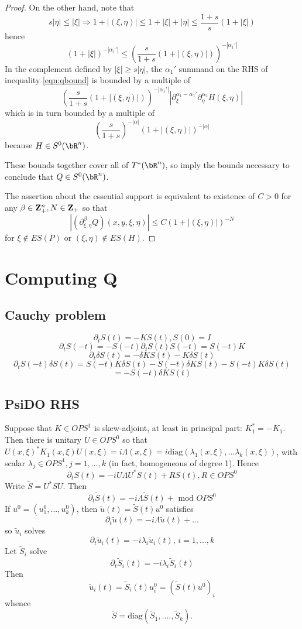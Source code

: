 \begin{proof}
  On the other hand, note that
  \[
    s|\eta| \le |\xi| \Rightarrow 1 + |(\xi,\eta)| \le 1 + |\xi| + |\eta| 
    \le \frac{1+s}{s} (1+ |\xi|) 
  \]
  hence
  \[
    (1 + |\xi|)^{-|\alpha_1'|} \le \left(\frac{s}{1+s}(1+|(\xi,\eta)|)\right)^{-|\alpha_1'|}   
  \]
  In the complement defined by $|\xi|\ge s|\eta|$, the $\alpha_1'$  summand on the RHS of inequality \ref{eqn:qbound} is bounded by a multiple of
  \[
    \left(\frac{s}{1+s}(1 + |(\xi,\eta)|)\right)^{-|\alpha_1'|}|\partial_{\xi}^{\alpha_1-\alpha_1'}\partial_{\eta}^{\alpha_2}H(\xi,\eta) |
  \]
  which is in turn bounded by a multiple of
  \[
    \left(\frac{s}{1+s}\right)^{-|\alpha|} (1+|(\xi,\eta)|)^{-|\alpha|}
  \]
  because $H \in S^0(\bR^n)$.

  These bounds together cover all of $T^*(\bR^n)$, so imply the bounds necessary to conclude that $Q \in S^0(\bR^n)$.
    
  The assertion about the essential support is equivalent to existence of $C>0$ for any $\beta \in {\bf Z}_+^n, N \in {\bf Z}_+$ so that
  \[
    |(\partial_{\xi,\eta}^{\beta} Q)(x,y,\xi, \eta)| \le C(1+|(\xi,\eta)|)^{-N}
  \]
  for $\xi \notin ES(P)$ or $(\xi,\eta) \notin ES(H)$.
\end{proof}

\section{Computing Q}

\subsection{Cauchy problem}
\[
  \partial_t S(t) = -K S(t), S(0)=I
\]
\[
  \partial_t S(-t) = -S(-t) \partial_t S(t) S(-t) = S(-t)K
\]
\[
  \partial_t \delta S(t) = - \delta K S(t) - K \delta S(t)
\]
\[
  \partial_t S(-t)\delta S(t) = S(-t)K\delta S(t) - S(-t) \delta K S(t) - S(-t)K \delta S(t)
\]
\begin{equation}
  \label{eqn:qevol1}
  =  -S(-t)\delta K S(t)
\end{equation}

\subsection{PsiDO RHS}
Suppose that $K \in OPS^1$ is skew-adjoint, at least in principal part: $K_1^*=-K_1$. Then there is unitary $U \in OPS^0$ so that $U(x,\xi)^*K_1(x,\xi)U(x,\xi) = i\Lambda(x,\xi) = i\mbox{diag}(\lambda_1(x,\xi),...\lambda_k(x,\xi))$, with scalar $\lambda_j \in OPS^1, j=1,...,k$ (in fact, homogeneous of degree 1). Hence
\[
  \partial_t S(t) = -iU \Lambda U^*S(t) + RS(t), R \in OPS^0 
\]
Write $\tilde{S} = U^*SU$. Then 
\[
  \partial_t \tilde{S}(t) = -i\Lambda \tilde{S}(t) + \mbox{ mod } OPS^0 
\]
If $u^0 = (u^0_1,...,u^0_k)$, then $\tilde{u}(t) = \tilde{S}(t)u^0$ satisfies
\[
  \partial_t \tilde{u}(t) = -i\Lambda \tilde{u}(t) + ...
\]
so $\tilde{u}_i$ solves
\[
  \partial_t \tilde{u}_i(t) = -i\lambda_i \tilde{u}_i(t), \, i=1,...,k
\]
Let $\tilde{S}_i$ solve
\[
  \partial_t \tilde{S}_i(t) = - i\lambda_i \tilde{S}_i(t)
\]
Then
\[
  \tilde{u}_i(t) = \tilde{S}_i(t) u^0_i = (\tilde{S}(t)u^0)_i 
\]
whence
\[
  \tilde{S} = \mbox{diag}(\tilde{S}_1,....,\tilde{S}_k).
\]


